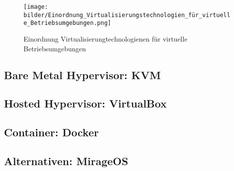 \begin{figure}[!ht]
  \begin{center}
    \texttt{[image: bilder/Einordnung\_Virtualisierungstechnologien\_für\_virtuelle\_Betriebsumgebungen.png]}
    \caption{Einordnung Virtualisierungtechnologienen für virtuelle Betriebsumgebungen \citep{Hirschbach06}}
    \label{an_tranciver}
  \end{center}
\end{figure}

\subsection{Bare Metal Hypervisor: KVM}

\subsection{Hosted Hypervisor: VirtualBox}

\subsection{Container: Docker}

\subsection{Alternativen: MirageOS}
